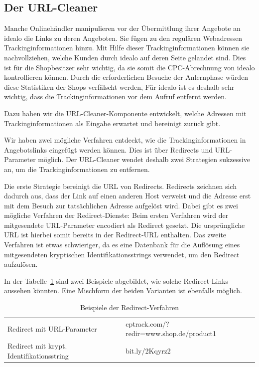 \subsection{Der URL-Cleaner}
\label{subsec:urlcleaner}

Manche Onlinehändler manipulieren vor der Übermittlung ihrer Angebote an idealo die Links zu deren Angeboten.
Sie fügen zu den regulären Webadressen Trackinginformationen hinzu.
Mit Hilfe dieser Trackinginformationen können sie nachvollziehen, welche Kunden durch idealo auf deren Seite gelandet
sind.
Dies ist für die Shopbesitzer sehr wichtig, da sie somit die CPC-Abrechnung von idealo kontrollieren können.
Durch die erforderlichen Besuche der Anlernphase würden diese Statistiken der Shops verfälscht werden,
Für idealo ist es deshalb sehr wichtig, dass die Trackinginformationen vor dem Aufruf entfernt werden.

Dazu haben wir die URL-Cleaner-Komponente entwickelt, welche Adressen mit Trackinginformationen als Eingabe erwartet und
bereinigt zurück gibt.

Wir haben zwei mögliche Verfahren entdeckt, wie die Trackinginformationen in Angebotslinks eingefügt werden können.
Dies ist über Redirects und URL-Parameter möglich.
Der URL-Cleaner wendet deshalb zwei Strategien sukzessive an, um die Trackinginformationen zu entfernen.

Die erste Strategie bereinigt die URL von Redirects.
Redirects zeichnen sich dadurch aus, dass der Link auf einen anderen Host verweist und die Adresse erst mit dem
Besuch zur tatsächlichen Adresse aufgelöst wird.
Dabei gibt es zwei mögliche Verfahren der Redirect-Dienste:
Beim ersten Verfahren wird der mitgesendete URL-Parameter encodiert als Redirect gesetzt.
Die ursprüngliche URL ist hierbei somit bereits in der Redirect-URL enthalten.
Das zweite Verfahren ist etwas schwieriger, da es eine Datenbank für die Auflösung eines mitgesendeten kryptischen
Identifikationsstrings verwendet, um den Redirect aufzulösen.

In der Tabelle~\ref{tab:redirect} sind zwei Beispiele abgebildet, wie solche Redirect-Links aussehen könnten.
Eine Mischform der beiden Varianten ist ebenfalls möglich.

\begin{table}[h]
    \centering
    \begin{tabular}{ l | l }
        Redirect mit URL-Parameter                  &   cptrack.com/?redir=www.shop.de/product1\\
        Redirect mit krypt. Identifikationsstring   &   bit.ly/2Kqyrz2
    \end{tabular}
    \caption{Beispiele der Redirect-Verfahren}
    \label{tab:redirect}
\end{table}

